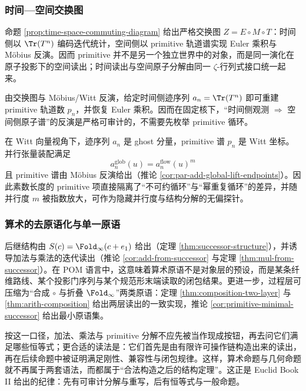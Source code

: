 \subsubsection{时间—空间交换图}\label{subsec:pom-time-space-diagram}
命题 \ref{prop:time-space-commuting-diagram} 给出严格交换图 $Z=E\circ M\circ T$：时间侧以 $\Tr(T^n)$ 编码迭代统计，空间侧以 primitive 轨道谱实现 Euler 乘积与 Möbius 反演。因而 primitive 并不是另一个独立世界中的对象，而是同一演化在原子投影下的空间读出；时间读出与空间原子分解由同一 $\zeta$-行列式接口统一起来。

\begin{remark}[时间迹重建空间原子谱]\label{rem:pom-trace-to-prime}
由交换图与 Möbius/Witt 反演，给定时间侧迹序列 $a_n=\Tr(T^n)$ 即可重建 primitive 轨道数 $p_n$，并恢复 Euler 乘积。因而在固定核下，“时间侧观测 $\Rightarrow$ 空间侧原子谱”的反演是严格可审计的，不需要先枚举 primitive 循环。
\end{remark}

\begin{remark}\label{rem:pom-witt-amplifier}
在 Witt 向量视角下，迹序列 $a_n$ 是 ghost 分量，primitive 谱 $p_n$ 是 Witt 坐标。并行张量装配满足
\[
a_n^{\mathrm{glob}}(u)=a_n^{\mathrm{flow}}(u)^m
\]
且 primitive 谱由 Möbius 反演给出（推论 \ref{cor:par-add-global-lift-endpoints}）。因此素数长度的 primitive 项直接隔离了“不可约循环”与“幂重复循环”的差异，并随并行度 $m$ 被指数放大，可作为隐藏并行度与结构分解的无偏探针。
\end{remark}

\subsubsection{算术的去原语化与单一原语}\label{subsec:pom-primitive-free}
后继结构由 $S(c)=\Fold_\infty(c+e_1)$ 给出（定理 \ref{thm:successor-structure}），并诱导加法与乘法的迭代读出（推论 \ref{cor:add-from-successor} 与定理 \ref{thm:mul-from-successor}）。在 POM 语言中，这意味着算术原语不是对象层的预设，而是某条纤维路线、某个投影门序列与某个规范形末端读取的闭包结果。更进一步，过程层可压缩为“合成 $\circ$ 与折叠 $\Fold_\infty$”两类原语：定理 \ref{thm:composition-two-layer} 与 \ref{thm:arith-composition} 给出两层读出的一致实现，推论 \ref{cor:primitive-minimal-successor} 给出最小原语集。

\begin{remark}\label{rem:pom-euclid-constructible-arithmetic}
按这一口径，加法、乘法与 primitive 分解不应先被当作现成按钮，再去问它们满足哪些恒等式；更合适的读法是：它们首先是由有限许可操作链构造出来的读出，再在后续命题中被证明满足刚性、兼容性与闭包规律。这样，算术命题与几何命题就不再属于两套语法，而都属于“合法构造之后的结构定理”。这正是 Euclid Book II 给出的纪律：先有可审计分解与重写，后有恒等式与一般命题。
\end{remark}

